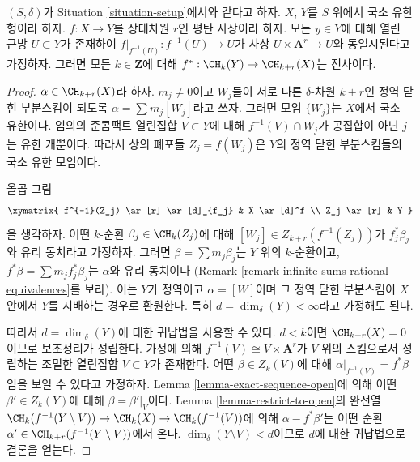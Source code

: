 \begin{lemma}
\label{lemma-pullback-affine-fibres-surjective}
$(S, \delta)$가 Situation \ref{situation-setup}에서와 같다고 하자.
$X$, $Y$를 $S$ 위에서 국소 유한형이라 하자.
$f : X \to Y$를 상대차원 $r$인 평탄 사상이라 하자.
모든 $y \in Y$에 대해 열린 근방 $U \subset Y$가 존재하여
$f|_{f^{-1}(U)} : f^{-1}(U) \to U$가 사상
$U \times \mathbf{A}^r \to U$와 동일시된다고 가정하자.
그러면 모든 $k \in \mathbf{Z}$에 대해
$f^* : \CH_k(Y) \to \CH_{k + r}(X)$는 전사이다.
\end{lemma}

\begin{proof}
$\alpha \in \CH_{k + r}(X)$라 하자. $m_j \not = 0$이고
$W_j$들이 서로 다른 $\delta$-차원 $k + r$인 정역 닫힌 부분스킴이
되도록 $\alpha = \sum m_j[W_j]$라고 쓰자. 그러면 모임 $\{W_j\}$는
$X$에서 국소 유한이다. 임의의 준콤팩트 열린집합 $V \subset Y$에 대해
$f^{-1}(V) \cap W_j$가 공집합이 아닌 $j$는 유한 개뿐이다. 따라서 상의
폐포들 $Z_j = \overline{f(W_j)}$은 $Y$의 정역 닫힌 부분스킴들의 국소
유한 모임이다.

\medskip\noindent
올곱 그림
$$
\xymatrix{
f^{-1}(Z_j) \ar[r] \ar[d]_{f_j} & X \ar[d]^f \\
Z_j \ar[r] & Y
}
$$
을 생각하자. 어떤 $k$-순환 $\beta_j \in \CH_k(Z_j)$에 대해
$[W_j] \in Z_{k + r}(f^{-1}(Z_j))$가 $f_j^*\beta_j$와 유리 동치라고
가정하자. 그러면 $\beta = \sum m_j \beta_j$는 $Y$ 위의 $k$-순환이고,
$f^*\beta = \sum m_j f_j^*\beta_j$는 $\alpha$와 유리 동치이다
(Remark \ref{remark-infinite-sums-rational-equivalences}를 보라).
이는 $Y$가 정역이고 $\alpha = [W]$이며 그 정역 닫힌 부분스킴이
$X$ 안에서 $Y$를 지배하는 경우로 환원한다. 특히
$d = \dim_\delta(Y) < \infty$라고 가정해도 된다.

\medskip\noindent
따라서 $d = \dim_\delta(Y)$에 대한 귀납법을 사용할 수 있다.
$d < k$이면 $\CH_{k + r}(X) = 0$이므로 보조정리가 성립한다. 가정에
의해 $f^{-1}(V) \cong V \times \mathbf{A}^r$가 $V$ 위의 스킴으로서
성립하는 조밀한 열린집합 $V \subset Y$가 존재한다.
어떤 $\beta \in Z_k(V)$에 대해
$\alpha|_{f^{-1}(V)} = f^*\beta$임을 보일 수 있다고 가정하자.
Lemma \ref{lemma-exact-sequence-open}에 의해 어떤
$\beta' \in Z_k(Y)$에 대해 $\beta = \beta'|_V$이다. Lemma
\ref{lemma-restrict-to-open}의 완전열
$\CH_k(f^{-1}(Y \setminus V)) \to \CH_k(X) \to \CH_k(f^{-1}(V))$에
의해 $\alpha - f^*\beta'$는 어떤 순환
$\alpha' \in \CH_{k + r}(f^{-1}(Y \setminus V))$에서 온다.
$\dim_\delta(Y \setminus V) < d$이므로 $d$에 대한 귀납법으로 결론을
얻는다.


\end{proof}
